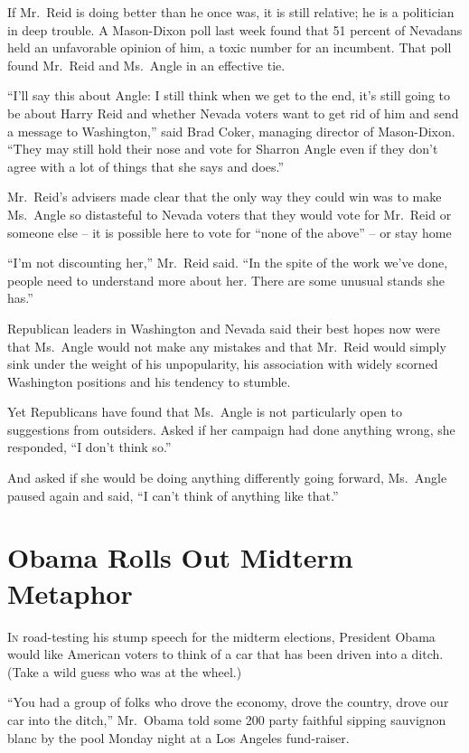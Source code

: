 ﻿\documentclass[12pt]{article}
\begin{document}
If Mr.~Reid is doing better than he once was, it is still relative; he is a politician in deep
trouble. A Mason-Dixon poll last week found that 51 percent of Nevadans held an unfavorable opinion
of him, a toxic number for an incumbent. That poll found Mr.~Reid and Ms.~Angle in an effective tie.

``I'll say this about Angle: I still think when we get to the end, it's still going to be about
Harry Reid and whether Nevada voters want to get rid of him and send a message to Washington,'' said
Brad Coker, managing director of Mason-Dixon. ``They may still hold their nose and vote for Sharron
Angle even if they don't agree with a lot of things that she says and does.''

Mr.~Reid's advisers made clear that the only way they could win was to make Ms.~Angle so distasteful
to Nevada voters that they would vote for Mr.~Reid or someone else -- it is possible here to vote
for ``none of the above'' -- or stay home

``I'm not discounting her,'' Mr.~Reid said. ``In the spite of the work we've done, people need to
understand more about her. There are some unusual stands she has.''

Republican leaders in Washington and Nevada said their best hopes now were that Ms.~Angle would not
make any mistakes and that Mr.~Reid would simply sink under the weight of his unpopularity, his
association with widely scorned Washington positions and his tendency to stumble.

Yet Republicans have found that Ms.~Angle is not particularly open to suggestions from outsiders.
Asked if her campaign had done anything wrong, she responded, ``I don't think so.''

And asked if she would be doing anything differently going forward, Ms.~Angle paused again and said,
``I can't think of anything like that.''

\section{Obama Rolls Out Midterm Metaphor}

\lettrine{I}{n} road-testing his stump speech for the midterm elections,
President Obama would like American voters to think of a car that has been driven into a ditch.
(Take a wild guess who was at the wheel.)

``You had a group of folks who drove the economy, drove the country, drove our car into the ditch,''
Mr.~Obama told some 200 party faithful sipping sauvignon blanc by the pool Monday night at a Los
Angeles fund-raiser.
\end{document}
